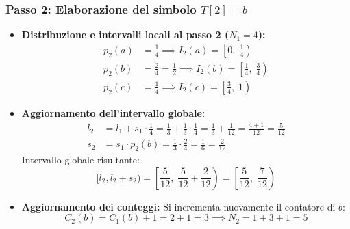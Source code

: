 \subsubsection*{Passo 2: Elaborazione del simbolo $T[2] = b$}
\begin{itemize}
  \item \textbf{Distribuzione e intervalli locali al passo 2 ($N_1 = 4$):}
  \begin{align}
    p_2(a) &= \frac{1}{4} \implies I_2(a) = \left[ 0, \; \frac{1}{4} \right) \\
    p_2(b) &= \frac{2}{4} = \frac{1}{2} \implies I_2(b) = \left[ \frac{1}{4}, \; \frac{3}{4} \right) \\
    p_2(c) &= \frac{1}{4} \implies I_2(c) = \left[ \frac{3}{4}, \; 1 \right)
  \end{align}
  \item \textbf{Aggiornamento dell'intervallo globale:}
  \begin{align}
    l_2 &= l_1 + s_1 \cdot \frac{1}{4} = \frac{1}{3} + \frac{1}{3} \cdot \frac{1}{4} = \frac{1}{3} + \frac{1}{12} = \frac{4 + 1}{12} = \frac{5}{12} \\
    s_2 &= s_1 \cdot p_2(b) = \frac{1}{3} \cdot \frac{2}{4} = \frac{1}{6} = \frac{2}{12}
  \end{align}
  Intervallo globale risultante:
  \begin{equation}
    [l_2, l_2 + s_2) = \left[ \frac{5}{12}, \; \frac{5}{12} + \frac{2}{12} \right) = \left[ \frac{5}{12}, \; \frac{7}{12} \right)
  \end{equation}
  \item \textbf{Aggiornamento dei conteggi:} Si incrementa nuovamente il contatore di $b$:
  \begin{equation}
    C_2(b) = C_1(b) + 1 = 2 + 1 = 3 \implies N_2 = 1 + 3 + 1 = 5
  \end{equation}
\end{itemize}

